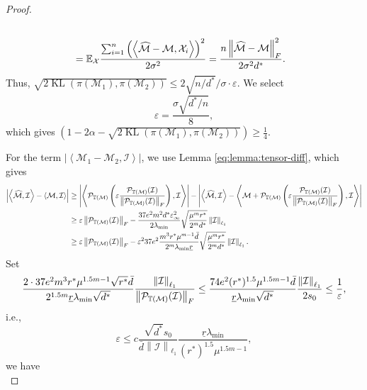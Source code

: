 \documentclass[12pt]{article}
\newcommand{\tF}{{\rm F}}
\newcommand{\abs}[1]{\left\lvert#1\right\rvert}
\newcommand{\norm}[1]{\left\lVert#1\right\rVert}
\newcommand{\E}{\mathbb{E}}
\newcommand{\cP}{\mathcal{P}}
\newcommand{\cM}{\mathcal{M}}
\newcommand{\cI}{\mathcal{I}}
\newcommand{\cX}{\mathcal{X}}
\def\TT{{\mathbb T}}
\newcommand{\dmax}{\bar{d}}
\theoremstyle{plain}
\begin{document}
\begin{proof}
\begin{equation*}
\begin{aligned}
        \\
        & =\E_{\cX} \frac{\sum_{i=1}^n\left(\left\langle\widehat{\cM}-\cM,\cX_i\right\rangle\right)^2 }{2\sigma^2} = \frac{n\norm{\widehat{\cM}-\cM}_{\tF}^2}{2\sigma^2 d^*}.
\end{aligned}
\end{equation*}
Thus, $\sqrt{  2\operatorname{KL}(\pi(\cM_1),\pi(\cM_2)) }\le 2\sqrt{n/d^*}/\sigma\cdot \varepsilon$. We select 
$$\varepsilon=\frac{\sigma\sqrt{d^*/n}}{8},$$
which gives  $\left(1-2\alpha-\sqrt{2\operatorname{KL}(\pi(\cM_1),\pi(\cM_2))} \right)\ge \frac{1}{4}$.

For the term $\abs{\left\langle \cM_1-\cM_2,\cI\right\rangle} $, we use Lemma \ref{eq:lemma:tensor-diff}, which gives 
\begin{equation*}
\begin{aligned}
         \abs{\left\langle \widehat{\cM},\cI \right\rangle-\left\langle\cM ,\cI \right\rangle} & \ge      \abs{\left\langle\cP_{\TT(\cM)}\left(\varepsilon\frac{\cP_{\TT(\cM)}(\cI)}{\norm{\cP_{\TT(\cM)}(\cI)}_{\tF}} \right) ,\cI \right\rangle}-  \abs{\left\langle \widehat{\cM},\cI \right\rangle-\left\langle\cM +\cP_{\TT(\cM)}\left(\varepsilon\frac{\cP_{\TT(\cM)}(\cI)}{\norm{\cP_{\TT(\cM)}(\cI)}_{\tF}} \right),\cI \right\rangle} 
         \\
         &\ge \varepsilon \norm{\cP_{\TT(\cM)}(\cI)}_{\tF}-  
     \frac{37e^2 m^2 d^*\varepsilon_{\infty}^2}{2\lambda_{\min} }\sqrt{\frac{\mu^m r^*}{ 2^md^*} }\norm{\cI}_{\ell_1}
     \\
     & \ge \varepsilon \norm{\cP_{\TT(\cM)}(\cI)}_{\tF}-  \varepsilon^2{37e^2 \frac{m^3r^*\mu^{m-1}\dmax}{2^{m}\lambda_{\min}\underline{r}}}\sqrt{\frac{\mu^m r^*}{ 2^md^*} }\norm{\cI}_{\ell_1}.
\end{aligned}
\end{equation*}
Set 
\begin{equation*}
     \frac{2\cdot 37e^2 m^3r^*\mu^{1.5m-1}\sqrt{r^*}\dmax}{2^{1.5m}\underline{r}\lambda_{\min}\sqrt{d^*}}\frac{\norm{\cI}_{\ell_1}}{\norm{\cP_{\TT(\cM)}(\cI)}_{\tF}} \le \frac{74 e^2 (r^*)^{1.5}\mu^{1.5m-1}\dmax}{\underline{r}\lambda_{\min}\sqrt{d^*}}\frac{\norm{\cI}_{\ell_1}}{2s_0}\le \frac{1}{\varepsilon },
\end{equation*}
i.e.,
\begin{equation}\label{eq:minimax-eps-3}
    \varepsilon\le c \frac{\sqrt{d^*}s_0}{\dmax\norm{\cI}_{\ell_1}} \frac{\underline{r}\lambda_{\min}}{(r^*)^{1.5}\mu^{1.5m-1}},
\end{equation}
we have 
\begin{equation*}

\end{equation*}
\end{proof}
\end{document}

